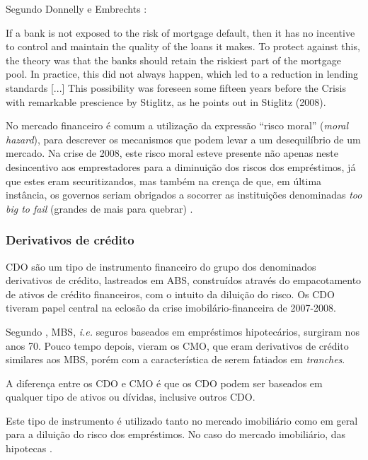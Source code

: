 \documentclass[
	12pt,				%
	oneside,			%
	a4paper,			%
	chapter=TITLE,		%
	section=TITLE,		%
	english,			%
	brazil				%
	]{abntex2}
\begin{document}
Segundo Donnelly e Embrechts \autocite*[5]{devil}:
\begin{citacao}
If a bank is not exposed to the risk of mortgage default, then it has no
incentive to control and maintain the quality of the loans it makes. To protect
against this, the theory was that the banks should retain the riskiest part of
the mortgage pool. In practice, this did not always happen, which led to a
reduction in lending standards [...] This possibility was foreseen some fifteen
years before the Crisis with remarkable prescience by Stiglitz, as he points out
in Stiglitz (2008).
\end{citacao}
No mercado financeiro é comum a utilização da expressão ``risco moral''
(\emph{moral hazard}), para descrever os mecanismos que podem levar a um
desequilíbrio de um mercado. Na crise de 2008, este risco moral esteve
presente não apenas neste desincentivo aos emprestadores para a
diminuição dos riscos dos empréstimos, já que estes eram securitizandos,
mas também na crença de que, em última instância, os governos seriam
obrigados a socorrer as instituições denominadas \emph{too big to fail}
(grandes de mais para quebrar) \autocite[4-5]{devil}.

\subsubsection{Derivativos de crédito}\label{derivativos-de-cruxe9dito}

\gls{CDO} são um tipo de instrumento financeiro do grupo dos denominados
derivativos de crédito, lastreados em \gls{ABS}, construídos através do
empacotamento de ativos de crédito financeiros, com o intuito da
diluição do risco. Os \gls{CDO} tiveram papel central na eclosão da
crise imobilário-financeira de 2007-2008.

Segundo \textcite{watts}, \gls{MBS}, \emph{i.e.} seguros baseados em
empréstimos hipotecários, surgiram nos anos 70. Pouco tempo depois,
vieram os \gls{CMO}, que eram derivativos de crédito similares aos
\gls{MBS}, porém com a característica de serem fatiados em
\emph{tranches}.

A diferença entre os \gls{CDO} e \gls{CMO} é que os \gls{CDO} podem ser
baseados em qualquer tipo de ativos ou dívidas, inclusive outros
\gls{CDO}.

Este tipo de instrumento é utilizado tanto no mercado imobiliário como
em geral para a diluição do risco dos empréstimos. No caso do mercado
imobiliário, das hipotecas \autocite[2]{watts}.
\end{document}
